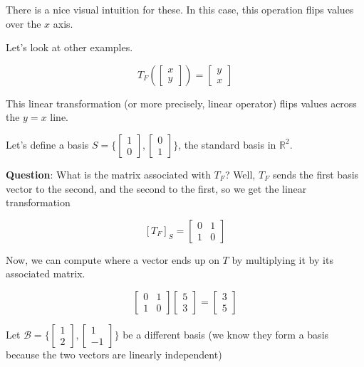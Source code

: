 \documentclass[12pt]{article}
\def\R{{\mathbb R}}
\def\B{\mathcal B}
\begin{document}
  There is a nice visual intuition for these. In this case, this operation flips
  values over the $x$ axis.

  Let's look at other examples.

  \[
    T_F (\begin{bmatrix} x \\ y \end{bmatrix}) = \begin{bmatrix} y \\ x \end{bmatrix}
  \]

  This linear transformation (or more precisely, linear operator) flips values
  across the $y = x$ line.

  Let's define a basis $S = \{\begin{bmatrix} 1 \\ 0 \end{bmatrix},
  \begin{bmatrix} 0 \\ 1 \end{bmatrix}\}$, the standard basis in $\R^2$.

  {\bf Question}: What is the matrix associated with $T_F$? Well, $T_F$ sends
  the first basis vector to the second, and the second to the first, so we get
  the linear transformation

  \[
    [T_F]_S = \begin{bmatrix}
      0 & 1 \\
      1 & 0
    \end{bmatrix}
  \]

  Now, we can compute where a vector ends up on $T$ by multiplying it by its
  associated matrix.

  \[
    \begin{bmatrix}
      0 & 1 \\
      1 & 0
    \end{bmatrix}
    \begin{bmatrix}
      5 \\ 3
    \end{bmatrix}
    =
    \begin{bmatrix}
      3 \\ 5
    \end{bmatrix}
  \]

  Let $\B = \{\begin{bmatrix} 1 \\ 2 \end{bmatrix}, \begin{bmatrix} 1 \\ -1
  \end{bmatrix}\}$ be a different basis (we know they form a basis because the two
  vectors are linearly independent)
\end{document}
